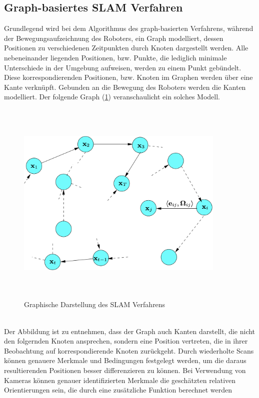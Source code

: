 \subsection*{Graph-basiertes SLAM Verfahren}
Grundlegend wird bei dem Algorithmus des graph-basierten Verfahrens, während der Bewegungsaufzeichnung des Roboters, ein Graph modelliert, 
dessen Positionen zu verschiedenen Zeitpunkten durch Knoten dargestellt werden. Alle nebeneinander liegenden Positionen, bzw. Punkte, die 
lediglich minimale Unterschiede in der Umgebung aufweisen, werden zu einem Punkt gebündelt. Diese korrespondierenden Positionen, bzw. 
Knoten im Graphen werden über eine Kante verknüpft. Gebunden an die Bewegung des Roboters werden die Kanten modelliert. Der folgende Graph 
(\ref{pic:GraphSLAM}) veranschaulicht ein solches Modell.
\begin{figure}[hbt!]
    \centering
    \includegraphics[width=10cm,height=10cm,keepaspectratio]{2Grundlagen/Bilder/graph_SLAM.png}
    \caption{Graphische Darstellung des SLAM Verfahrens \cite{graphSLAM.2010}}
    \label{pic:GraphSLAM}
\end{figure}
\\ 
Der Abbildung ist zu entnehmen, dass der Graph auch Kanten darstellt, die nicht den folgernden Knoten ansprechen, sondern eine 
Position vertreten, die in ihrer Beobachtung auf korrespondierende Knoten zurückgeht. Durch wiederholte Scans können genauere Merkmale und 
Bedingungen festgelegt werden, um die daraus resultierenden Positionen besser differenzieren zu können. Bei Verwendung von Kameras können 
genauer identifizierten Merkmale die geschätzten relativen Orientierungen sein, die durch eine zusätzliche Funktion berechnet werden 
